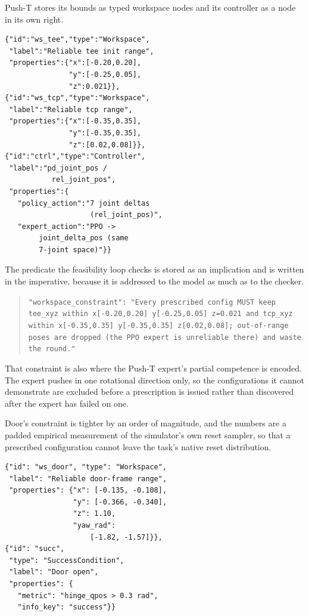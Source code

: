 \documentclass[letterpaper]{article}
\begin{document}
Push-T stores its bounds as typed workspace nodes and its controller as a node in its
own right.

\begin{verbatim}
{"id":"ws_tee","type":"Workspace",
 "label":"Reliable tee init range",
 "properties":{"x":[-0.20,0.20],
               "y":[-0.25,0.05],
               "z":0.021}},
{"id":"ws_tcp","type":"Workspace",
 "label":"Reliable tcp range",
 "properties":{"x":[-0.35,0.35],
               "y":[-0.35,0.35],
               "z":[0.02,0.08]}},
{"id":"ctrl","type":"Controller",
 "label":"pd_joint_pos /
           rel_joint_pos",
 "properties":{
   "policy_action":"7 joint deltas
                    (rel_joint_pos)",
   "expert_action":"PPO ->
        joint_delta_pos (same
        7-joint space)"}}
\end{verbatim}

The predicate the feasibility loop checks is stored as an implication and is written in
the imperative, because it is addressed to the model as much as to the checker.

\begin{quote}
\raggedright
\texttt{"workspace\_constraint": "Every prescribed config MUST keep tee\_xyz within
x[-0.20,0.20] y[-0.25,0.05] z=0.021 and tcp\_xyz within x[-0.35,0.35] y[-0.35,0.35]
z[0.02,0.08]; out-of-range poses are dropped (the PPO expert is unreliable there) and
waste the round."}
\end{quote}

That constraint is also where the Push-T expert's partial competence is encoded. The
expert pushes in one rotational direction only, so the configurations it cannot
demonstrate are excluded before a prescription is issued rather than discovered after
the expert has failed on one.

Door's constraint is tighter by an order of magnitude, and the numbers are a padded
empirical measurement of the simulator's own reset sampler, so that a prescribed
configuration cannot leave the task's native reset distribution.

\begin{verbatim}
{"id": "ws_door", "type": "Workspace",
 "label": "Reliable door-frame range",
 "properties": {"x": [-0.135, -0.108],
                "y": [-0.366, -0.340],
                "z": 1.10,
                "yaw_rad":
                    [-1.82, -1.57]}},
{"id": "succ",
 "type": "SuccessCondition",
 "label": "Door open",
 "properties": {
   "metric": "hinge_qpos > 0.3 rad",
   "info_key": "success"}}
\end{verbatim}
\end{document}
